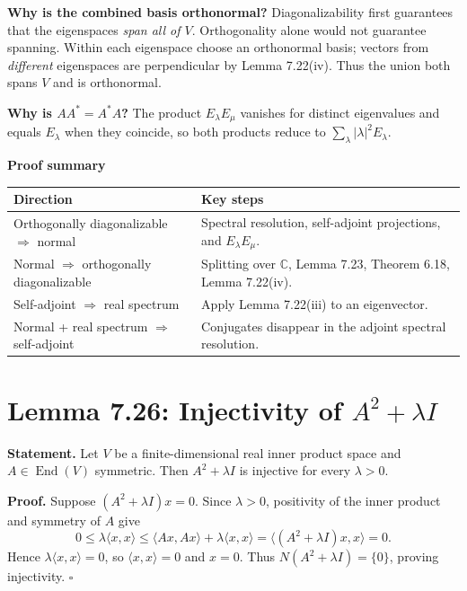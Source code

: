 \documentclass[11pt,a4paper]{article}
\newcommand{\prooftable}[1]{\medskip\textbf{Proof summary}\par\smallskip #1\medskip}
\begin{document}
\begin{personalnote}
\textbf{Why is the combined basis orthonormal?}
Diagonalizability first guarantees that the eigenspaces \emph{span all of \(V\)}. Orthogonality alone would not guarantee spanning. Within each eigenspace choose an orthonormal basis; vectors from \emph{different} eigenspaces are perpendicular by Lemma 7.22(iv). Thus the union both spans \(V\) and is orthonormal.

\medskip

\textbf{Why is \(AA^*=A^*A\)?}
The product \(E_\lambda E_\mu\) vanishes for distinct eigenvalues and equals \(E_\lambda\) when they coincide, so both products reduce to \(\sum_\lambda|\lambda|^2E_\lambda\).
\end{personalnote}
\prooftable{\begin{tabularx}{\linewidth}{@{}p{.30\linewidth}X@{}}\hline
Direction & Key steps\\\hline
Orthogonally diagonalizable \(\Rightarrow\) normal & Spectral resolution, self-adjoint projections, and \(E_\lambda E_\mu\).\\
Normal \(\Rightarrow\) orthogonally diagonalizable & Splitting over \(\mathbb C\), Lemma 7.23, Theorem 6.18, Lemma 7.22(iv).\\
Self-adjoint \(\Rightarrow\) real spectrum & Apply Lemma 7.22(iii) to an eigenvector.\\
Normal + real spectrum \(\Rightarrow\) self-adjoint & Conjugates disappear in the adjoint spectral resolution.\\\hline
\end{tabularx}}

\section{Lemma 7.26: Injectivity of \(A^2+\lambda I\)}
\textbf{Statement.} Let \(V\) be a finite-dimensional real inner product space and \(A\in\operatorname{End}(V)\) symmetric. Then \(A^2+\lambda I\) is injective for every \(\lambda>0\).

\textbf{Proof.} Suppose \((A^2+\lambda I)x=0\).
Since \(\lambda>0\), positivity of the inner product and symmetry of \(A\) give
\[
0\leq\lambda\langle x,x\rangle
\leq\langle Ax,Ax\rangle+\lambda\langle x,x\rangle
=\langle(A^2+\lambda I)x,x\rangle=0.
\]
Hence \(\lambda\langle x,x\rangle=0\), so \(\langle x,x\rangle=0\) and \(x=0\).
Thus \(N(A^2+\lambda I)=\{0\}\), proving injectivity. \(\square\)
\end{document}
